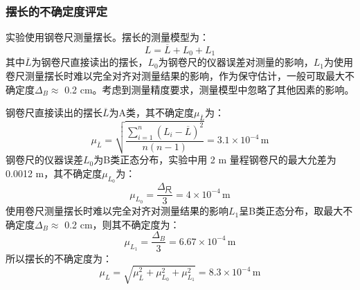\documentclass[a4paper]{extarticle}
\begin{document}
    \subsubsection{摆长的不确定度评定}
    \hspace{2em}
    实验使用钢卷尺测量摆长。摆长的测量模型为：
    \begin{equation*}
        L=\overline{L}+L_0+L_1
    \end{equation*}
    其中$\overline{L}$为钢卷尺直接读出的摆长，$L_0$为钢卷尺的仪器误差对测量的影响，$L_1$为使用卷尺测量摆长时难以完全对齐对测量结果的影响，作为保守估计，一般可取最大不确定度$\Delta_B\approx$ 0.2 cm。考虑到测量精度要求，测量模型中忽略了其他因素的影响。
    \par\hspace{2em}
    钢卷尺直接读出的摆长$\overline{L}$为A类，其不确定度$\mu_{\overline{L}}$为：
    \begin{equation*}
        \mu_{\overline{L}}=\sqrt{\frac{\sum\limits_{i=1}^{n}(L_i-\overline{L})^2}{n(n-1)}}=3.1\times10^{-4}\,\text{m}
    \end{equation*}
    钢卷尺的仪器误差$L_0$为B类正态分布，实验中用 2 m 量程钢卷尺的最大允差为 0.0012
    m，其不确定度$\mu_{L_0}$为：
    \begin{equation*}
        \mu_{L_0}=\frac{\Delta_\text{尺}}{3}=4\times10^{-4}\,\text{m}
    \end{equation*}
    \hspace{2em}
    使用卷尺测量摆长时难以完全对齐对测量结果的影响$L_1$呈B类正态分布，取最大不确定度$\Delta_B\approx$ 0.2 cm，则其不确定度为：
    \begin{equation*}
        \mu_{L_1}=\frac{\Delta_B}{3}=6.67\times10^{-4}\,\text{m}
    \end{equation*}
    \hspace{2em}
    所以摆长的不确定度为：
    \begin{equation*}
        \mu_L=\sqrt{\mu_{\overline{L}}^2+\mu_{L_0}^2+\mu_{L_1}^2}=8.3\times10^{-4}\,\text{m}
    \end{equation*}
\end{document}
